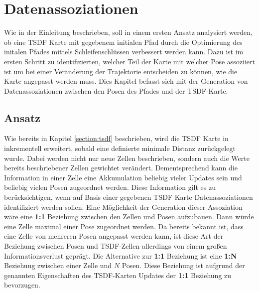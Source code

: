 \chapter{Datenassoziationen}\label{chapter:association}

Wie in der Einleitung beschrieben, soll in einem ersten Ansatz analysiert werden, ob eine TSDF Karte mit gegebenem initialen Pfad durch die Optimierung des initalen Pfades mittels Schleifenschlüssen verbessert werden kann. Dazu ist im ersten Schritt zu identifizierten, welcher Teil der Karte mit welcher Pose assoziiert ist um bei einer Veränderung der Trajektorie entscheiden zu können, wie die Karte angepasst werden muss. Dies Kapitel befasst sich mit der Generation von Datenassoziationen zwischen den Posen des Pfades und der TSDF-Karte.

\section{Ansatz}
\label{section:ansatz}

Wie bereits in Kapitel \ref{section:tsdf} beschrieben, wird die TSDF Karte in \cite{HATSDF} inkrementell erweitert, sobald eine definierte minimale Distanz zurückgelegt wurde. Dabei werden nicht nur neue Zellen beschrieben, sondern auch die Werte bereits beschriebener Zellen gewichtet verändert. Dementsprechend kann die Information in einer Zelle eine Akkumulation beliebig vieler Updates sein und beliebig vielen Posen zugeordnet werden. Diese Information gilt es zu berücksichtigen, wenn auf Basis einer gegebenen TSDF Karte Datenassoziationen identifiziert werden sollen.
Eine Möglichkeit der Generation dieser Assoziation wäre eine \textbf{1:1} Beziehung zwischen den Zellen und Posen aufzubauen. Dann würde eine Zelle maximal einer Pose zugeordnet werden. Da bereits bekannt ist, dass eine Zelle von mehreren Posen angepasst werden kann, ist diese Art der Beziehung zwischen Posen und TSDF-Zellen allerdings von einem großen Informationsverlust geprägt. Die Alternative zur \textbf{1:1} Beziehung ist eine \textbf{1:N} Beziehung zwischen einer Zelle und $N$ Posen. Diese Beziehung ist aufgrund der genannten Eigenschaften des TSDF-Karten Updates der \textbf{1:1} Beziehung zu bevorzugen.

